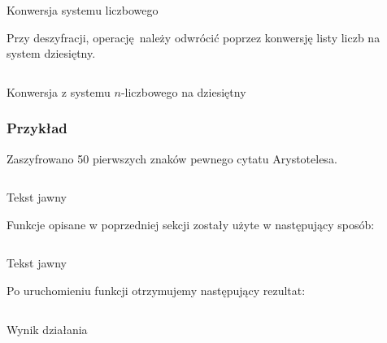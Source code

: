 \documentclass[12pt]{article}
\begin{document}
\begin{listing}[H]
	\inputminted[firstline=7,lastline=17]{python}{../rsa.py}
	\caption{Konwersja systemu liczbowego}
\end{listing}

Przy deszyfracji, operację należy odwrócić poprzez konwersję listy
liczb na system dziesiętny.

\begin{listing}[H]
	\inputminted[firstline=19,lastline=26]{python}{../rsa.py}
	\caption{Konwersja z systemu $n$-liczbowego na dziesiętny}
\end{listing}

\subsubsection{Przykład}

Zaszyfrowano 50 pierwszych znaków pewnego cytatu Arystotelesa.

\begin{listing}[H]
	\inputminted[firstline=12,lastline=15]{python}{../aes_tests.py}
	\caption{Tekst jawny}
\end{listing}

Funkcje opisane w poprzedniej sekcji zostały użyte w następujący sposób:

\begin{listing}[H]
	\inputminted[firstline=54,lastline=59]{python}{../cli.py}
	\caption{Tekst jawny}
\end{listing}

Po uruchomieniu funkcji otrzymujemy następujący rezultat:

\begin{listing}[H]
	\inputminted{yaml}{3-rsa-enc-test.txt}
	\caption{Wynik działania}
\end{listing}
\end{document}
